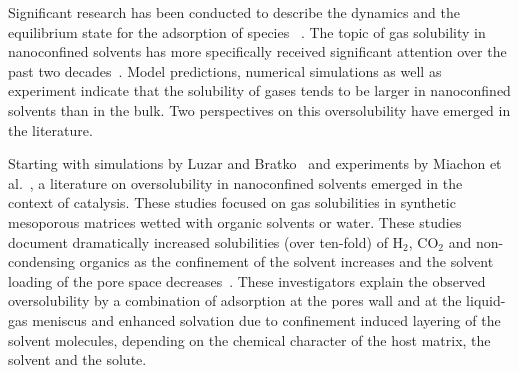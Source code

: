 \documentclass[aps,prl,twocolumn,superscriptaddress,groupedaddress]{revtex4}
\begin{document}
Significant research has been conducted to describe the dynamics and the equilibrium state for the adsorption of species ~\cite{bruch,thommes_2015,albasimionesco_2006,soprunyuk_2016}. The topic of gas solubility in nanoconfined solvents has more specifically received significant attention over the past two decades~\cite{mercury_2003,lassin_2005,luzar_2005,miachon_2008,peratitus_2009b,rakotovao_2010,ho_2011,clauzier_2012,soubeyrandlenoir_2012,ho_2013,ho_2015,sanchezgonzalez_2016,lassin_2016}.
Model predictions, numerical simulations as well as experiment indicate that the solubility of gases tends to be larger in nanoconfined solvents than in the bulk. Two perspectives on this oversolubility have emerged in the literature.

Starting with simulations by Luzar and Bratko~\cite{luzar_2005,bratko_2008} and experiments by Miachon et al.~\cite{miachon_2008}, a literature on oversolubility in nanoconfined solvents emerged in the context of catalysis. These studies focused on gas solubilities in synthetic mesoporous matrices wetted with organic solvents or water. These studies document dramatically increased solubilities (over ten-fold) of $\mathrm{H_2}$, $\mathrm{CO_2}$ and non-condensing organics as the confinement of the solvent increases and the solvent loading of the pore space decreases~\cite{luzar_2005,miachon_2008,ho_2011,ho_2013,ho_2015}. These investigators explain the observed oversolubility by a combination of adsorption at the pores wall and at the liquid-gas meniscus and enhanced solvation due to confinement induced layering of the solvent molecules, depending on the chemical character of the host matrix, the solvent and the solute.
\end{document}

